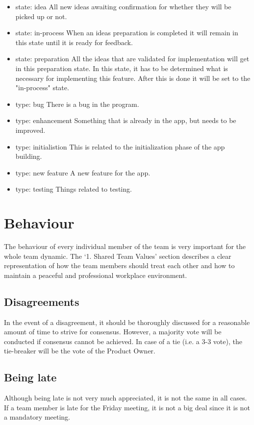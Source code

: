 \documentclass[sigconf,nonacm]{acmart}
\begin{document}
\begin{itemize}
    \item state: idea           All new ideas awaiting confirmation for whether they will be picked up or not.
    \item state: in-process     When an ideas preparation is completed it will remain in this state until it is ready for feedback.
    \item state: preparation    All the ideas that are validated for implementation will get in this preparation state. In this state, it has to be determined what is necessary for implementing this feature. After this is done it will be set to the "in-process" state.
    \item type: bug             There is a bug in the program.          
    \item type: enhancement     Something that is already in the app, but needs to be improved.
    \item type: initialistion   This is related to the initialization phase of the app building.
    \item type: new feature     A new feature for the app.
    \item type: testing         Things related to testing.
\end{itemize}


\section{Behaviour}
The behaviour of every individual member of the team is very important for the whole team dynamic. The ‘1. Shared Team Values’ section describes a clear representation of how the team members should treat each other and how to maintain a peaceful and professional workplace environment.

\subsection{Disagreements}
In the event of a disagreement, it should be thoroughly discussed for a reasonable amount of time to strive for consensus. However, a majority vote will be conducted if consensus cannot be achieved. In case of a tie (i.e. a 3-3 vote), the tie-breaker will be the vote of the Product Owner.

\subsection{Being late}
Although being late is not very much appreciated, it is not the same in all cases. If a team member is late for the Friday meeting, it is not a big deal since it is not a mandatory meeting.
\end{document}
